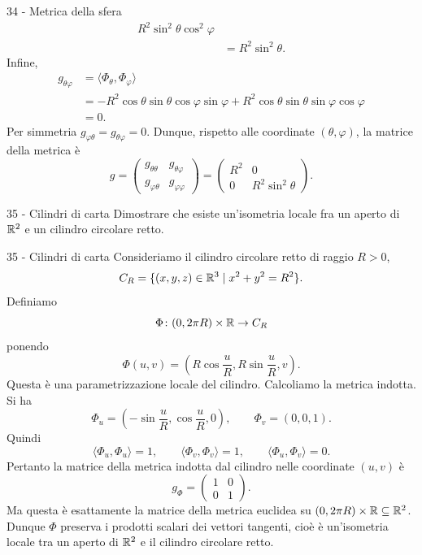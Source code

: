 \documentclass[a4paper]{article}
\begin{document}
\begin{snippetsolution}{34 - Metrica della sfera}
\begin{align*}
        R^2\sin^2\theta\cos^2\varphi\\
        &=
        R^2\sin^2\theta.
    \end{align*}
    Infine,
    \begin{align*}
        g_{\theta\varphi}
        &=
        \langle \Phi_\theta,\Phi_\varphi\rangle\\
        &=
        -R^2\cos\theta\sin\theta\cos\varphi\sin\varphi
        +
        R^2\cos\theta\sin\theta\sin\varphi\cos\varphi\\
        &=
        0.
    \end{align*}
    Per simmetria \(g_{\varphi\theta}=g_{\theta\varphi}=0\). Dunque, rispetto alle coordinate \((\theta,\varphi)\), la matrice della metrica è
    \[
        g
        =
        \begin{pmatrix}
            g_{\theta\theta} & g_{\theta\varphi}\\
            g_{\varphi\theta} & g_{\varphi\varphi}
        \end{pmatrix}
        =
        \begin{pmatrix}
            R^2 & 0\\
            0 & R^2\sin^2\theta
        \end{pmatrix}.
    \]
\end{snippetsolution}

\begin{snippetexercise}{35 - Cilindri di carta}
    Dimostrare che esiste un'isometria locale fra un aperto di
    \(\mathbb{R}^2\) e un cilindro circolare retto.
\end{snippetexercise}

\begin{snippetsolution}{35 - Cilindri di carta}
    Consideriamo il cilindro circolare retto di raggio \(R>0\),
    \[
        C_R=\{(x,y,z)\in\mathbb{R}^3\mid x^2+y^2=R^2\}.
    \]
    Definiamo
    \[
        \Phi\colon(0,2\pi R)\times\mathbb{R}\to C_R
    \]
    ponendo
    \[
        \Phi(u,v)=
        \left(
            R\cos\frac{u}{R},
            R\sin\frac{u}{R},
            v
        \right).
    \]
    Questa è una parametrizzazione locale del cilindro. Calcoliamo la metrica indotta. Si ha
    \[
        \Phi_u=
        \left(
            -\sin\frac{u}{R},
            \cos\frac{u}{R},
            0
        \right),
        \qquad
        \Phi_v=(0,0,1).
    \]
    Quindi
    \[
        \langle\Phi_u,\Phi_u\rangle=1,
        \qquad
        \langle\Phi_v,\Phi_v\rangle=1,
        \qquad
        \langle\Phi_u,\Phi_v\rangle=0.
    \]
    Pertanto la matrice della metrica indotta dal cilindro nelle coordinate \((u,v)\) è
    \[
        g_\Phi=
        \begin{pmatrix}
            1 & 0\\
            0 & 1
        \end{pmatrix}.
    \]
    Ma questa è esattamente la matrice della metrica euclidea su \((0,2\pi R)\times\mathbb{R}\subseteq\mathbb{R}^2\). Dunque \(\Phi\) preserva i prodotti scalari dei vettori tangenti, cioè è un'isometria locale tra un aperto di \(\mathbb{R}^2\) e il cilindro circolare retto.
\end{snippetsolution}
\end{document}
